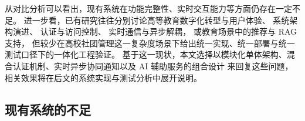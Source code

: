 \begin{table}[H]
\centering
\caption{典型社团管理系统对比分析}
\label{tab:system-comparison}
\end{table}

从对比分析可以看出，现有系统在功能完整性、实时交互能力等方面仍存在一定不足。
进一步看，已有研究往往分别讨论高等教育数字化转型与用户体验\cite{fernandez_he_dt_2023,mabotha_he_dt_2026,potocan_he_students_2025,aljanazrah_dt_crisis_2022}、
系统架构演进\cite{microservices2015,microservices_patterns2018}、
认证与访问控制\cite{jwt_rfc,rbac_model}、
实时通信与异步解耦\cite{websocket_realtime,rabbitmq_docs}，
或教育场景中的推荐与 RAG 支持\cite{urdaneta_education_rs_2021,deschenes_rs_2020,swacha_rag_education_2025}，
但较少在高校社团管理这一复杂度场景下给出统一实现、统一部署与统一测试口径下的一体化工程验证。
基于这一现状，本文选择以模块化单体架构、混合认证机制、实时异步协同通知以及 AI 辅助服务的组合设计
来回复这些问题，相关效果将在后文的系统实现与测试分析中展开说明。

\subsection{现有系统的不足}

